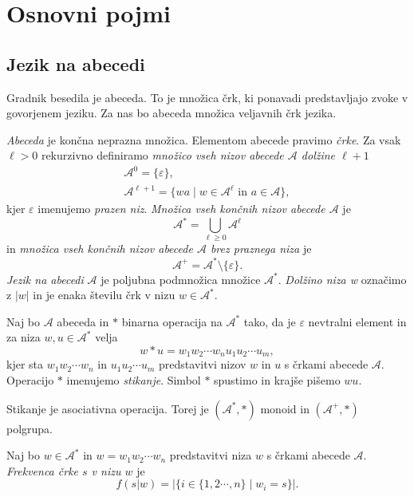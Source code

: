 \documentclass[fin1, tisk]{fmfdelo}
\providecommand{\abs}[1]{\left\lvert #1 \right\rvert}
\newcommand{\A}{\mathcal{A}}
\theoremstyle{definition}
\begin{document}
\section{Osnovni pojmi}

\subsection{Jezik na abecedi}
Gradnik besedila je abeceda. To je množica črk, ki ponavadi predstavljajo zvoke v govorjenem
jeziku. Za nas bo abeceda množica veljavnih črk jezika.

\begin{definicija}
    \emph{Abeceda} je končna neprazna množica. Elementom abecede pravimo \emph{črke}.
    Za vsak $\ell > 0$ rekurzivno definiramo \emph{množico vseh nizov abecede $\A$ dolžine 
    $\ell + 1$}
    \begin{gather*}
        \A^0 = \{ \varepsilon \}, \\
        \A^{\ell+1} = \{ wa \mid w \in \A^{\ell} \text{ in } a \in \A \},
    \end{gather*}
    kjer $\varepsilon$ imenujemo \emph{prazen niz}.
    \emph{Množica vseh končnih nizov abecede $\A$} je
    \[
        \A^* = \bigcup_{\ell \geq 0} \A^\ell
    \]
    in \emph{množica vseh končnih nizov abecede $\A$ brez praznega niza} je
    \[
        \A^+ = \A^* \setminus \{ \varepsilon \}.
    \]
    \emph{Jezik na abecedi} $\A$ je poljubna podmnožica množice $\A^*$. 
    \emph{Dolžino niza w} označimo z $\abs{w}$ in je enaka številu črk v nizu $ w \in \A^* $.
\end{definicija}

\begin{definicija}
    Naj bo $\A$ abeceda in $*$ binarna operacija na $\A^*$ tako, da je $\varepsilon$ 
    nevtralni element in za niza $ w, u \in \A^* $ velja
    \[
        w*u = w_1w_2 \cdots w_nu_1u_2 \cdots u_m,
    \]
    kjer sta $w_1w_2 \cdots w_n$ in $u_1u_2 \cdots u_m$ predstavitvi nizov $w$ in $u$ s črkami
    abecede $\A$. Operacijo $*$ imenujemo \emph{stikanje}. Simbol $*$ spustimo in 
    krajše pišemo $wu$.
\end{definicija}

\begin{opomba}
    Stikanje je asociativna operacija. Torej je $(\A^*, *)$ monoid in $(\A^+, *)$ polgrupa.
\end{opomba}

\begin{definicija}
    Naj bo $w \in \A^*$ in $w = w_1w_2 \cdots w_n$ predstavitvi niza $w$ s črkami abecede 
    $\A$. \emph{Frekvenca črke $s$ v nizu $w$} je
    \[
        f(s|w) = \abs{ \bigl\{ i \in \{1, 2 \cdots, n\} \mid w_i = s \bigr\} }.
    \]
\end{definicija}
\end{document}
